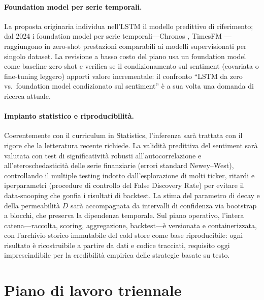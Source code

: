 \documentclass[a4paper,11pt]{article}
\begin{document}
\paragraph{Foundation model per serie temporali.} La proposta originaria individua nell'LSTM il modello predittivo di riferimento; dal 2024 i foundation model per serie temporali---Chronos \parencite{ansari2024chronos}, TimesFM \parencite{das2024timesfm}---raggiungono in zero-shot prestazioni comparabili ai modelli supervisionati per singolo dataset. La revisione a basso costo del piano usa un foundation model come baseline zero-shot e verifica se il condizionamento sul sentiment (covariata o fine-tuning leggero) apporti valore incrementale: il confronto ``LSTM da zero vs.\ foundation model condizionato sul sentiment'' è a sua volta una domanda di ricerca attuale.

\paragraph{Impianto statistico e riproducibilità.} Coerentemente con il curriculum in Statistics, l'inferenza sarà trattata con il rigore che la letteratura recente richiede. La validità predittiva del sentiment sarà valutata con test di significatività robusti all'autocorrelazione e all'eteroschedasticità delle serie finanziarie (errori standard Newey--West), controllando il multiple testing indotto dall'esplorazione di molti ticker, ritardi e iperparametri (procedure di controllo del False Discovery Rate) per evitare il data-snooping che gonfia i risultati di backtest. La stima del parametro di decay e della permeabilità $D$ sarà accompagnata da intervalli di confidenza via bootstrap a blocchi, che preserva la dipendenza temporale. Sul piano operativo, l'intera catena---raccolta, scoring, aggregazione, backtest---è versionata e containerizzata, con l'archivio storico immutabile del cold store come base riproducibile: ogni risultato è ricostruibile a partire da dati e codice tracciati, requisito oggi imprescindibile per la credibilità empirica delle strategie basate su testo.

\section{Piano di lavoro triennale}
\end{document}
